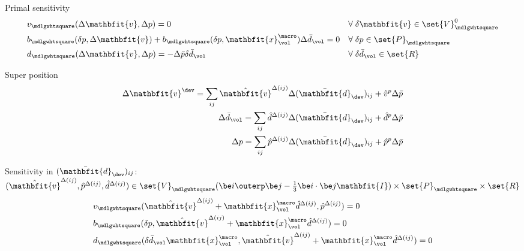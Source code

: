 \documentclass[a4paper,11pt]{article}
\renewcommand{\ta}[1]{\mathbfit{#1}}
\renewcommand{\ts}[1]{\mathbfit{#1}}
\renewcommand{\Box}{\mdlgwhtsquare}
\begin{document}
Primal sensitivity
\begin{align}
 &v_\Box(\Delta\ta v,\Delta p) = 0 && \forall\; \delta\ta v\in \set{V}_\Box^0\\
 &b_\Box(\delta p,\Delta\ta v) + b_\Box(\delta p,\ta x^\macro_\vol) \Delta\bar{d}_\vol = 0 && \forall\; \delta p \in \set{P}_\Box\\
 &d_\Box(\Delta\ta v,\Delta p) = -\Delta\bar{p} \delta\bar{d}_\vol && \forall\;\delta\bar{d}_\vol \in \set{R}
\end{align}

Super position
\begin{align}
 \Delta \ta v^\dev = \sum_{ij} \hat{\ta v}^{\Delta(ij)} \Delta(\bar{\ts d}_\dev)_{ij} + \hat{v}^p \Delta\bar{p}
 \\
 \Delta \bar{d}_\vol = \sum_{ij} \hat{d}^{\Delta(ij)} \Delta(\bar{\ts d}_\dev)_{ij} + \hat{d}^p \Delta\bar{p}
 \\
 \Delta p = \sum_{ij} \hat{p}^{\Delta(ij)} \Delta(\bar{\ts d}_\dev)_{ij} + \hat{p}^p \Delta\bar{p}
\end{align}

Sensitivity in $(\bar{\ts d}_\dev)_{ij}$: $(\hat{\ta v}^{\Delta(ij)}, \hat{p}^{\Delta(ij)}, \hat{d}^{\Delta(ij)}) \in \set{V}_\Box(\be i\outerp\be j - \frac13\be i\cdot\be j\ts I)\times \set{P}_\Box \times\set{R}$
\begin{align}
 &v_\Box(\hat{\ta v}^{\Delta(ij)}+\ta x^\macro_\vol \hat{d}^{\Delta(ij)}, \hat{p}^{\Delta(ij)}) = 0
 \\
 &b_\Box(\delta p,\hat{\ta v}^{\Delta(ij)} + \ta x^\macro_\vol \hat{d}^{\Delta(ij)}) = 0
 \\
 &d_\Box(\delta\bar{d}_\vol\ta x^\macro_\vol,\hat{\ta v}^{\Delta(ij)}+\ta x^\macro_\vol \hat{d}^{\Delta(ij)}) = 0
\end{align}
\end{document}
